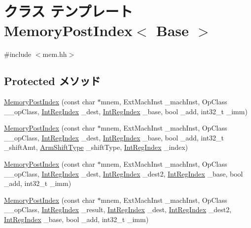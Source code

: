 \hypertarget{classArmISA_1_1MemoryPostIndex}{
\section{クラス テンプレート MemoryPostIndex$<$ Base $>$}
\label{classArmISA_1_1MemoryPostIndex}
}


{\ttfamily \#include $<$mem.hh$>$}\subsection*{Protected メソッド}
\begin{DoxyCompactItemize}
\item 
\hyperlink{classArmISA_1_1MemoryPostIndex_a70b63896bd9f4cbd92bdc9951da8a46e}{MemoryPostIndex} (const char $\ast$mnem, ExtMachInst \_\-machInst, OpClass \_\-\_\-opClass, \hyperlink{namespaceArmISA_ae64680ba9fb526106829d6bf92fc791b}{IntRegIndex} \_\-dest, \hyperlink{namespaceArmISA_ae64680ba9fb526106829d6bf92fc791b}{IntRegIndex} \_\-base, bool \_\-add, int32\_\-t \_\-imm)
\item 
\hyperlink{classArmISA_1_1MemoryPostIndex_a8a56fe8fc97038f8659c3e783d58ba05}{MemoryPostIndex} (const char $\ast$mnem, ExtMachInst \_\-machInst, OpClass \_\-\_\-opClass, \hyperlink{namespaceArmISA_ae64680ba9fb526106829d6bf92fc791b}{IntRegIndex} \_\-dest, \hyperlink{namespaceArmISA_ae64680ba9fb526106829d6bf92fc791b}{IntRegIndex} \_\-base, bool \_\-add, int32\_\-t \_\-shiftAmt, \hyperlink{namespaceArmISA_a209d79feaaef0aa2f54ae62e53ee90de}{ArmShiftType} \_\-shiftType, \hyperlink{namespaceArmISA_ae64680ba9fb526106829d6bf92fc791b}{IntRegIndex} \_\-index)
\item 
\hyperlink{classArmISA_1_1MemoryPostIndex_a31ed115298292436229e6b5b5afe4de1}{MemoryPostIndex} (const char $\ast$mnem, ExtMachInst \_\-machInst, OpClass \_\-\_\-opClass, \hyperlink{namespaceArmISA_ae64680ba9fb526106829d6bf92fc791b}{IntRegIndex} \_\-dest, \hyperlink{namespaceArmISA_ae64680ba9fb526106829d6bf92fc791b}{IntRegIndex} \_\-dest2, \hyperlink{namespaceArmISA_ae64680ba9fb526106829d6bf92fc791b}{IntRegIndex} \_\-base, bool \_\-add, int32\_\-t \_\-imm)
\item 
\hyperlink{classArmISA_1_1MemoryPostIndex_a33785e2c522637e99435373031ba610f}{MemoryPostIndex} (const char $\ast$mnem, ExtMachInst \_\-machInst, OpClass \_\-\_\-opClass, \hyperlink{namespaceArmISA_ae64680ba9fb526106829d6bf92fc791b}{IntRegIndex} \_\-result, \hyperlink{namespaceArmISA_ae64680ba9fb526106829d6bf92fc791b}{IntRegIndex} \_\-dest, \hyperlink{namespaceArmISA_ae64680ba9fb526106829d6bf92fc791b}{IntRegIndex} \_\-dest2, \hyperlink{namespaceArmISA_ae64680ba9fb526106829d6bf92fc791b}{IntRegIndex} \_\-base, bool \_\-add, int32\_\-t \_\-imm)

\end{DoxyCompactItemize}
